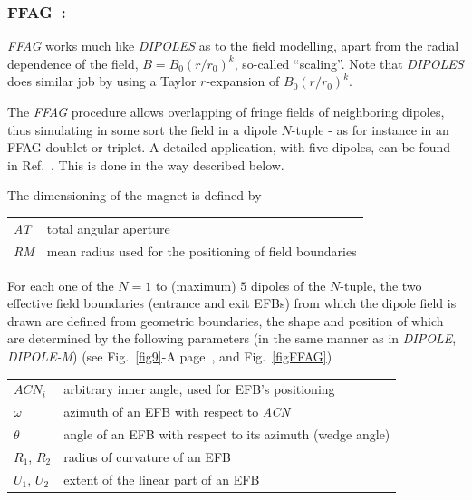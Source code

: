 \newpage


\subsubsection*{FFAG~: \FFAGTitl~\cite{reportNIMFFAG,reportICFAFFAG}} \label{FFAG}   
\medskip

\noindent \textsl{FFAG} works much like \textsl{DIPOLES} 
as to the field modelling, apart from the  radial dependence of the field, $B=B_0(r/r_0)^k$, so-called ``scaling''. 
Note that \textsl{DIPOLES} does similar job by using a Taylor $r$-expansion of $B_0(r/r_0)^k$. 

\medskip

\noindent The \textsl{FFAG} procedure allows overlapping of fringe fields of neighboring dipoles, 
thus simulating in some sort the field in a dipole $N$-tuple - as for instance in an FFAG doublet 
or triplet. A detailed application, with 
five dipoles, can be found in Ref.~\cite{reportNIMFFAG}. This is done in the way described below. 

\medskip

\noindent  The dimensioning of the magnet is defined by

\medskip

 \begin{tabular}{>{\sl}l!{~:}l}
	 AT &  total angular aperture \\
	 RM & mean radius used for the positioning of field boundaries\\
 \end{tabular}

\medskip

\noindent For each one of the $N=1$ to (maximum) $5$ dipoles of the  $N$-tuple, 
the two  effective field boundaries (entrance and exit EFBs) from which  the dipole field  is drawn are
defined from geometric boundaries, the shape and position of which are determined by the 
following parameters (in the same manner as in \textsl{DIPOLE}, \textsl{DIPOLE-M})
 (see Fig.~\ref{fig9}-A page~\pageref{fig9}, and Fig.~\ref{figFFAG}) 

\medskip

\begin{tabular}{l!{~:}l}
	$ACN_i$  & arbitrary inner angle, used for EFB's positioning  \\
	$\omega$ &  azimuth of an EFB with respect to  \textsl{ACN}\\
	$\theta$ & angle of an EFB with respect to its azimuth (wedge angle)\\ 
	$R_1$, $R_2$  &  radius of curvature of an EFB\\
	$U_1$, $U_2$  &  extent of the linear part of an EFB  \\
\end{tabular}

